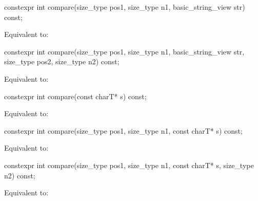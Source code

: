 %
\begin{itemdecl}
constexpr int compare(size_type pos1, size_type n1, basic_string_view str) const;
\end{itemdecl}

\begin{itemdescr}
\pnum
\effects
Equivalent to: 
\end{itemdescr}

%
\begin{itemdecl}
constexpr int compare(size_type pos1, size_type n1, basic_string_view str,
                      size_type pos2, size_type n2) const;
\end{itemdecl}

\begin{itemdescr}
\pnum
\effects
Equivalent to: 
\end{itemdescr}

%
\begin{itemdecl}
constexpr int compare(const charT* s) const;
\end{itemdecl}

\begin{itemdescr}
\pnum
\effects
Equivalent to: 
\end{itemdescr}

%
\begin{itemdecl}
constexpr int compare(size_type pos1, size_type n1, const charT* s) const;
\end{itemdecl}

\begin{itemdescr}
\pnum
\effects
Equivalent to: 
\end{itemdescr}

%
\begin{itemdecl}
constexpr int compare(size_type pos1, size_type n1,
                      const charT* s, size_type n2) const;
\end{itemdecl}

\begin{itemdescr}
\pnum
\effects
Equivalent to: 
\end{itemdescr}

